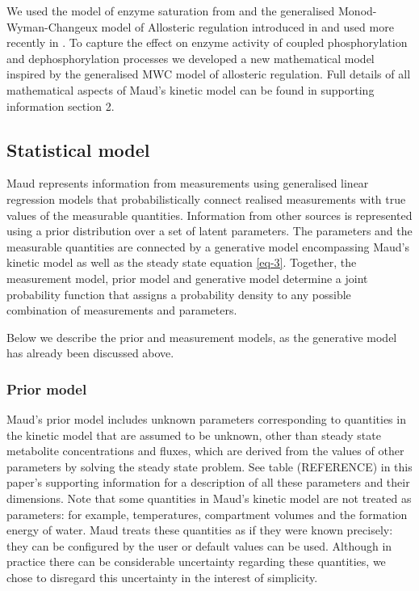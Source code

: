 \documentclass[journal=asbcd6,manuscript=article,layout=traditional]{achemso}
\begin{document}
We used the model of enzyme saturation from
\citet{liebermeister_modular_2010} and the generalised
Monod-Wyman-Changeux model of Allosteric regulation introduced in
\citep{monod_nature_1965, changeux_2013, popova_generalization_1975, popova_description_1979}
and used more recently in \citet{matosGRASPComputationalPlatform2022}.
To capture the effect on enzyme activity of coupled phosphorylation and
dephosphorylation processes we developed a new mathematical model
inspired by the generalised MWC model of allosteric regulation. Full
details of all mathematical aspects of Maud's kinetic model can be found
in supporting information section 2.

\hypertarget{statistical-model}{%
\subsection{Statistical model}\label{statistical-model}}

Maud represents information from measurements using generalised linear
regression models that probabilistically connect realised measurements
with true values of the measurable quantities. Information from other
sources is represented using a prior distribution over a set of latent
parameters. The parameters and the measurable quantities are connected
by a generative model encompassing Maud's kinetic model as well as the
steady state equation \eqref{eq-3}. Together, the measurement model,
prior model and generative model determine a joint probability function
that assigns a probability density to any possible combination of
measurements and parameters.

Below we describe the prior and measurement models, as the generative
model has already been discussed above.

\hypertarget{prior-model}{%
\subsubsection{Prior model}\label{prior-model}}

Maud's prior model includes unknown parameters corresponding to
quantities in the kinetic model that are assumed to be unknown, other
than steady state metabolite concentrations and fluxes, which are
derived from the values of other parameters by solving the steady state
problem. See table (REFERENCE) in this paper's supporting information
for a description of all these parameters and their dimensions. Note
that some quantities in Maud's kinetic model are not treated as
parameters: for example, temperatures, compartment volumes and the
formation energy of water. Maud treats these quantities as if they were
known precisely: they can be configured by the user or default values
can be used. Although in practice there can be considerable uncertainty
regarding these quantities, we chose to disregard this uncertainty in
the interest of simplicity.
\end{document}
